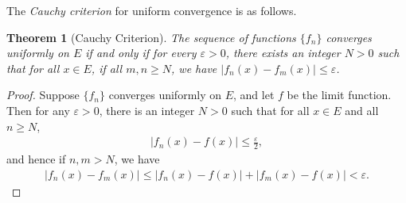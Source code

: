 \documentclass[10pt]{book}
\newtheorem{theorem}{Theorem}[chapter]
\theoremstyle{definition}
\numberwithin{equation}{chapter}
\begin{document}
\medskip

The {\em Cauchy criterion} for uniform convergence is as follows.

\medskip

\begin{theorem}[Cauchy Criterion]
The sequence of functions $\{f_n\}$ converges uniformly on $E$ if and only if for every $\varepsilon > 0$, there exists an integer $N > 0$ such that for all $x \in E$, if all $m,n \geq N$, we have $\left|f_n(x) - f_m(x)\right| \leq \varepsilon$.
\end{theorem}
\begin{proof}
Suppose $\{f_n\}$ converges uniformly on $E$, and let $f$ be the limit function. Then for any $\varepsilon > 0$, there is an integer $N > 0$ such that for all $x \in E$ and all $n \geq N$,
\begin{align*}
    \left|f_n(x) - f(x)\right| \leq \frac{\varepsilon}{2},
\end{align*}
and hence if $n,m > N$, we have
\begin{align*}
    \left|f_n(x) - f_m(x)\right| \leq \left|f_n(x) - f(x)\right| + \left|f_m(x) - f(x)\right| < \varepsilon.
\end{align*}


\end{proof}









\newpage


\end{document}
